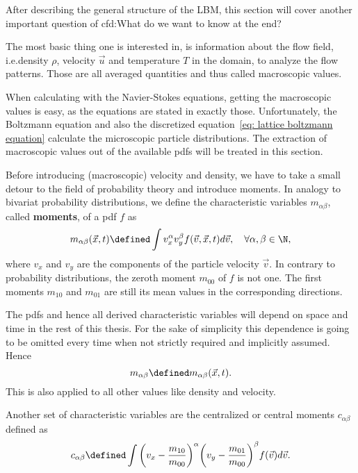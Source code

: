 After describing the general structure of the LBM, this section will cover another important question of \gls{cfd}:\@ What do we want to know at the end?

The most basic thing one is interested in, is information about the flow field, i.e.\@ density $\rho$, velocity $\vec{u}$ and temperature $T$ in the domain, to analyze the flow patterns.
Those are all averaged quantities and thus called macroscopic values.

When calculating with the Navier-Stokes equations, getting the macroscopic values is easy, as the equations are stated in exactly those.
Unfortunately, the Boltzmann equation and also the discretized equation~\eqref{eq: lattice boltzmann equation} calculate the microscopic particle distributions.
The extraction of macroscopic values out of the available \glspl{pdf} will be treated in this section.

Before introducing (macroscopic) velocity and density, we have to take a small detour to the field of probability theory and introduce moments.
In analogy to bivariat probability distributions, we define the characteristic variables $m_{\alpha\beta}$, called \textbf{moments}, of a \gls{pdf} $f$ as
\begin{equation}
  \label{eq: moments continuous}
  m_{\alpha\beta}(\vec{x},t) \defined  \int v_x^\alpha v_y^\beta f(\vec{v},\vec{x},t) d\vec{v},\quad\forall\alpha,\beta\in\N,
\end{equation}
where $v_x$ and $v_y$ are the components of the particle velocity $\vec{v}$.
In contrary to probability distributions, the zeroth moment $m_{00}$ of $f$ is not one.
The first moments $m_{10}$ and $m_{01}$ are still its mean values in the corresponding directions.

The \glspl{pdf} and hence all derived characteristic variables will depend on space and time in the rest of this thesis.
For the sake of simplicity this dependence is going to be omitted every time when not strictly required and implicitly assumed. Hence
\begin{equation}
  \label{eq: leave out x and y}
  m_{\alpha\beta} \defined m_{\alpha\beta}(\vec{x},t).
\end{equation}
This is also applied to all other values like density and velocity.

Another set of characteristic variables are the centralized or central moments $c_{\alpha\beta}$ defined as
\begin{equation}
  \label{eq: central moments continuous}
  c_{\alpha\beta} \defined \int {\left(v_x - \frac{m_{10}}{m_{00}}\right)}^\alpha {\left(v_y-\frac{m_{01}}{m_{00}}\right)}^\beta f(\vec{v})  d\vec{v}.
\end{equation}

